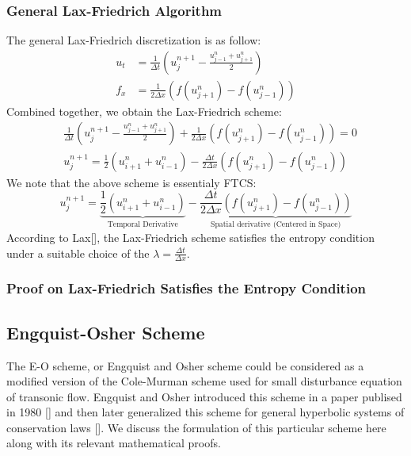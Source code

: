 \documentclass[a4paper]{article}
\numberwithin{equation}{section}
\begin{document}
\subsubsection{General Lax-Friedrich Algorithm}
The general Lax-Friedrich discretization is as follow:
\begin{equation}
    \begin{split}
        u_t &= \frac{1}{\Delta t}\left( u^{n+1}_j - \frac{u^n_{j-1} + u^n_{j+1}}{2} \right)  \\
        f_x &= \frac{1}{2\Delta x}\left(f(u^n_{j+1}) - f(u^n_{j-1})\right)
    \end{split}
\end{equation}
Combined together, we obtain the Lax-Friedrich scheme:
\begin{equation}
    \begin{split}
        &\frac{1}{\Delta t}\left( u^{n+1}_j - \frac{u^n_{j-1} + u^n_{j+1}}{2} \right) + \frac{1}{2\Delta x}\left(f(u^n_{j+1}) - f(u^n_{j-1})\right) = 0 \\
        &u_j^{n+1} = \frac{1}{2}(u_{i+1}^n + u_{i-1}^n) - \frac{\Delta t}{2\Delta x}\left(f(u^n_{j+1}) - f(u^n_{j-1})\right)
    \end{split}
\end{equation}
We note that the above scheme is essentialy FTCS:
\begin{equation}
    u_j^{n+1} = \underbrace{\frac{1}{2}(u_{i+1}^n + u_{i-1}^n)}_{\text{Temporal Derivative}} - \underbrace{\frac{\Delta t}{2\Delta x}\left(f(u^n_{j+1}) - f(u^n_{j-1})\right)}_{\text{Spatial derivative (Centered in Space)}}
\end{equation}
According to Lax[], the Lax-Friedrich scheme satisfies the entropy condition under a suitable choice of the $\lambda = \frac{\Delta t}{\Delta x}$.

\subsubsection{Proof on Lax-Friedrich Satisfies the Entropy Condition}

\subsection{Engquist-Osher Scheme}
The E-O scheme, or Engquist and Osher scheme could be considered as a modified version of the Cole-Murman scheme used for small disturbance equation of transonic flow.  Engquist and Osher introduced this scheme in a paper publised in 1980 [] and then later generalized this scheme for general hyperbolic systems of conservation laws []. We discuss the formulation of this particular scheme here along with its relevant mathematical proofs.
\end{document}
